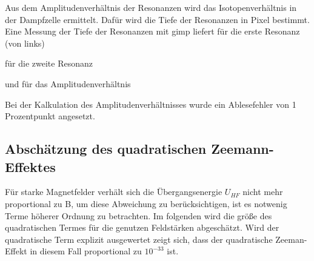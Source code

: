 Aus dem Amplitudenverhältnis der Resonanzen wird das Isotopenverhältnis in der
Dampfzelle ermittelt. Dafür wird die Tiefe der Resonanzen in Pixel bestimmt.
Eine Messung der Tiefe der Resonanzen mit gimp liefert für die erste Resonanz (von links)



für die zweite Resonanz



und für das Amplitudenverhältnis



Bei der Kalkulation des Amplitudenverhältnisses wurde ein Ablesefehler von 1 Prozentpunkt
angesetzt.

\subsection{Abschätzung des quadratischen Zeemann-Effektes}
Für starke Magnetfelder verhält sich die Übergangsenergie $U_{HF}$ nicht mehr proportional zu B, um diese Abweichung zu berücksichtigen, ist es notwenig Terme höherer Ordnung zu betrachten.
Im folgenden wird die größe des quadratischen Termes für die genutzen Feldstärken abgeschätzt. Wird der quadratische Term explizit ausgewertet zeigt sich, dass der quadratische Zeeman-Effekt
in diesem Fall proportional zu $10^{-33}$ ist.
